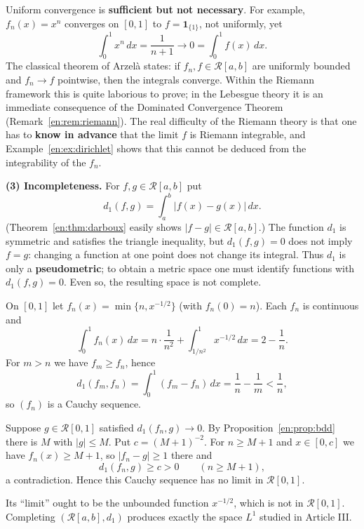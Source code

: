 \documentclass[11pt]{article}
\makeatletter
\newcommand{\envlabel}[1]{\protected@edef\@currentlabel{\themathenv}\label{#1}}
\makeatother
\begin{document}
\begin{remark}\envlabel{en:rem:unif}
Uniform convergence is \textbf{sufficient but not necessary}. For example, $f_{n}(x)=x^{n}$ converges on $[0,1]$ to $f=\mathbf{1}_{\{1\}}$, not uniformly, yet
\[
\int_{0}^{1}x^{n}\,dx=\frac{1}{n+1}\to0=\int_{0}^{1}f(x)\,dx.
\]
The classical theorem of Arzelà states: if $f_{n},f\in\mathcal{R}[a,b]$ are uniformly bounded and $f_{n}\to f$ pointwise, then the integrals converge. Within the Riemann framework this is quite laborious to prove; in the Lebesgue theory it is an immediate consequence of the Dominated Convergence Theorem (Remark~\ref{en:rem:riemann}). The real difficulty of the Riemann theory is that one has to \textbf{know in advance} that the limit $f$ is Riemann integrable, and Example~\ref{en:ex:dirichlet} shows that this cannot be deduced from the integrability of the $f_{n}$.
\end{remark}

\textbf{(3) Incompleteness.} For $f,g\in\mathcal{R}[a,b]$ put
\[
d_{1}(f,g)=\int_{a}^{b}|f(x)-g(x)|\,dx.
\]
(Theorem~\ref{en:thm:darboux} easily shows $|f-g|\in\mathcal{R}[a,b]$.) The function $d_{1}$ is symmetric and satisfies the triangle inequality, but $d_{1}(f,g)=0$ does not imply $f=g$: changing a function at one point does not change its integral. Thus $d_{1}$ is only a \textbf{pseudometric}; to obtain a metric space one must identify functions with $d_{1}(f,g)=0$. Even so, the resulting space is not complete.

\begin{example}\envlabel{en:ex:incomplete}
On $[0,1]$ let $f_{n}(x)=\min\{n,x^{-1/2}\}$ (with $f_{n}(0)=n$). Each $f_{n}$ is continuous and
\[
\int_{0}^{1}f_{n}(x)\,dx=n\cdot\frac{1}{n^{2}}+\int_{1/n^{2}}^{1}x^{-1/2}\,dx=2-\frac1n.
\]
For $m>n$ we have $f_{m}\geq f_{n}$, hence
\[
d_{1}(f_{m},f_{n})=\int_{0}^{1}(f_{m}-f_{n})\,dx=\frac1n-\frac1m<\frac1n,
\]
so $(f_{n})$ is a Cauchy sequence.

Suppose $g\in\mathcal{R}[0,1]$ satisfied $d_{1}(f_{n},g)\to0$. By Proposition~\ref{en:prop:bdd} there is $M$ with $|g|\leq M$. Put $c=(M+1)^{-2}$. For $n\geq M+1$ and $x\in[0,c]$ we have $f_{n}(x)\geq M+1$, so $|f_{n}-g|\geq1$ there and
\[
d_{1}(f_{n},g)\geq c>0\qquad(n\geq M+1),
\]
a contradiction. Hence this Cauchy sequence has no limit in $\mathcal{R}[0,1]$.
\end{example}

Its ``limit'' ought to be the unbounded function $x^{-1/2}$, which is not in $\mathcal{R}[0,1]$. Completing $(\mathcal{R}[a,b],d_{1})$ produces exactly the space $L^{1}$ studied in Article III.
\end{document}
